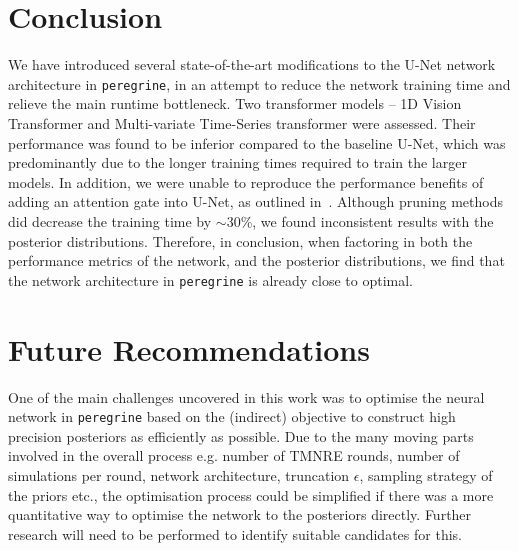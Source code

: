 \section{Conclusion}
\label{sec:conclusion}

We have introduced several state-of-the-art modifications to the U-Net network architecture in \texttt{peregrine}, in an attempt to reduce the network training time and relieve the main runtime bottleneck. Two transformer models -- 1D Vision Transformer and Multi-variate Time-Series transformer were assessed. Their performance was found to be inferior compared to the baseline U-Net, which was predominantly due to the longer training times required to train the larger models. In addition, we were unable to reproduce the performance benefits of adding an attention gate into U-Net, as outlined in~\cite{Oktay_2018_AUNet}. Although pruning methods did decrease the training time by $\sim$30\%, we found inconsistent results with the posterior distributions. Therefore, in conclusion, when factoring in both the performance metrics of the network, and the posterior distributions, we find that the network architecture in \texttt{peregrine} is already close to optimal.

\section{Future Recommendations}
\label{sec:future}

One of the main challenges uncovered in this work was to optimise the neural network in \texttt{peregrine} based on the (indirect) objective to construct high precision posteriors as efficiently as possible. Due to the many moving parts involved in the overall process e.g. number of TMNRE rounds, number of simulations per round, network architecture, truncation $\epsilon$, sampling strategy of the priors etc., the optimisation process could be simplified if there was a more quantitative way to optimise the network to the posteriors directly. Further research will need to be performed to identify suitable candidates for this.

